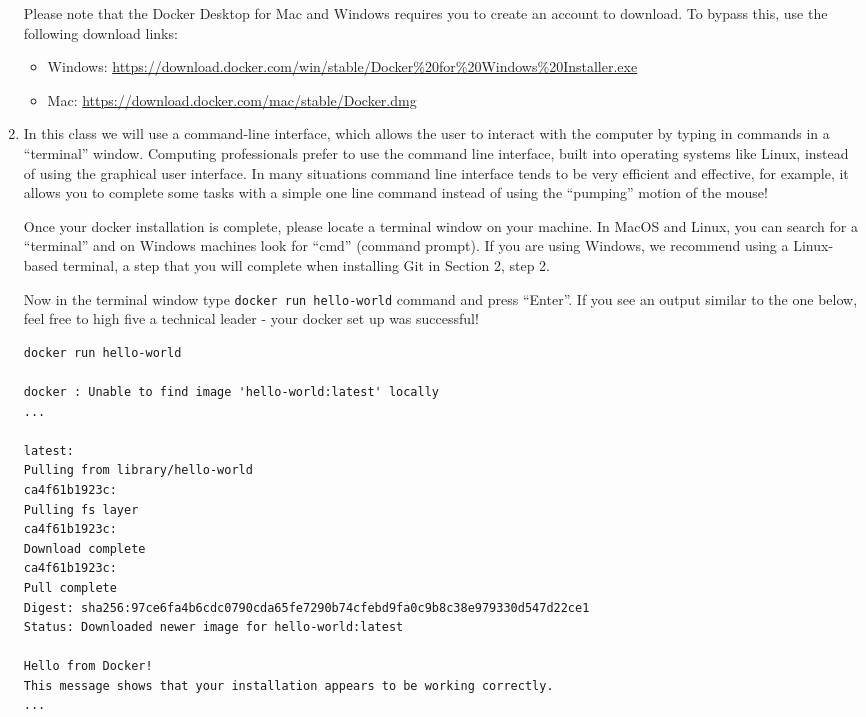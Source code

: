 \begin{enumerate}
 Please note that the Docker Desktop for Mac and Windows requires you to create an account to download. To bypass this, use the following download links:
	\begin{itemize}
		\item Windows: \url{ https://download.docker.com/win/stable/Docker%20for%20Windows%20Installer.exe}
		\item Mac: \url{ https://download.docker.com/mac/stable/Docker.dmg}
	\end{itemize}
	\item In this class we will use a command-line interface, which allows the user to interact with the computer by typing in commands in a ``terminal'' window. Computing professionals prefer to use the command line interface, built into operating systems like Linux, instead of using the graphical user interface. In many situations command line interface tends to be very efficient and effective, for example, it allows you to complete some tasks with a simple one line command instead of using the ``pumping'' motion of the mouse!
	
	Once your docker installation is complete, please locate a terminal window on your machine. In MacOS and Linux, you can search for a ``terminal'' and on Windows machines look for ``cmd'' (command prompt). If you are using Windows, we recommend using a Linux-based terminal, a step that you will complete when installing Git in Section 2, step 2. 
	
	Now in the terminal window type {\tt docker run hello-world} command and press ``Enter''. If you see an output similar to the one below, feel free to high five a technical leader - your docker set up was successful!
	
	

\begin{verbatim}	
docker run hello-world

docker : Unable to find image 'hello-world:latest' locally
...

latest:
Pulling from library/hello-world
ca4f61b1923c:
Pulling fs layer
ca4f61b1923c:
Download complete
ca4f61b1923c:
Pull complete
Digest: sha256:97ce6fa4b6cdc0790cda65fe7290b74cfebd9fa0c9b8c38e979330d547d22ce1
Status: Downloaded newer image for hello-world:latest

Hello from Docker!
This message shows that your installation appears to be working correctly.
...
\end{verbatim}

\end{enumerate}

